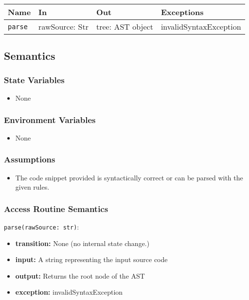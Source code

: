 \documentclass[12pt, titlepage]{article}
\begin{document}
\begin{center}
\begin{tabular}{p{5cm} p{3.5cm} p{3.5cm} p{2cm}}
\hline
\textbf{Name} & \textbf{In} & \textbf{Out} & \textbf{Exceptions} \\
\hline
\texttt{parse} & rawSource: Str & tree: AST object  & invalidSyntaxException \\
\hline
\end{tabular}
\end{center}

\subsection{Semantics}

\subsubsection{State Variables}

\begin{itemize}
    \item None
\end{itemize}

\subsubsection{Environment Variables}

\begin{itemize}
  \item None
\end{itemize}

\subsubsection{Assumptions}

\begin{itemize}
    \item The code snippet provided is syntactically correct or can be parsed with the given rules.
\end{itemize}

\subsubsection{Access Routine Semantics}

\noindent \texttt{parse(rawSource: str)}:
\begin{itemize}
    \item \textbf{transition:} None (no internal state change.)
    \item \textbf{input:} A string representing the input source code
    \item \textbf{output:} Returns the root node of the AST
    \item \textbf{exception:} invalidSyntaxException
\end{itemize}
\end{document}
